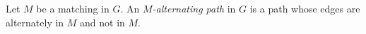 

\setcounter{section}{4}
\setcounter{subsection}{2}
\setcounter{dfn}{3}

\begin{dfn}
Let $M$ be a matching in $G$.
An \emph{$M$-alternating path} in $G$ is a path whose edges are alternately in $M$ and not in $M$.
\end{dfn}


